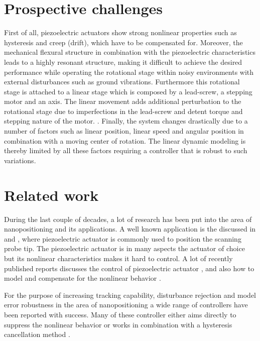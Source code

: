 \section{Prospective challenges}\label{sec:prospectiveChallanges}
First of all, piezoelectric actuators show strong nonlinear properties such as hysteresis and creep (drift), which have to be compensated for.\citep{Piezo:2008} Moreover, the mechanical flexural structure in combination with the piezoelectric characteristics leads to a highly resonant structure, making it difficult to achieve the desired performance while operating the rotational stage within noisy environments with external disturbances such as ground vibrations. Furthermore this rotational stage is attached to a linear stage which is composed by a lead-screw, a stepping motor and an axis. The linear movement adds additional perturbation to the rotational stage due to imperfections in the lead-screw and detent torque and stepping nature of the motor. \citep{ButcherController:2015}. Finally, the system changes drastically due to a number of factors such as linear position, linear speed and angular position in combination with a moving center of rotation. The linear dynamic modeling is thereby limited by all these factors requiring a controller that is robust to such variations.

\section{Related work}
During the last couple of decades, a lot of research has been put into the area of nanopositioning and its applications. A well known application is the \abbrAFM discussed in \citep{SurveyOfControlIssues:2007} and \citep{chuang2013robust}, where piezoelectric actuator is commonly used to position the scanning probe tip. The piezoelectric actuator is in many aspects the actuator of choice but its nonlinear characteristics makes it hard to control. A lot of recently published reports discusses the control of piezoelectric actuator \citep{gu2016modeling}, \citep{gu2013motion} and also how to model and compensate for the nonlinear behavior \citep{Maxwell:2012}  \citep{leang2002hysteresis} \citep{ButcherIdentification:2015} \citep{Biggio:2014}.

For the purpose of increasing tracking capability, disturbance rejection and model error robustness in the area of nanopositioning a wide range of controllers have been reported with success. Many of these controller either aims directly to suppress the nonlinear behavior \citep{ompc} \citep{xu2014model} \citep{Elmali:1996} or works in combination with a hysteresis cancellation method \citep{gu:2014} \citep{inputshaper}.

